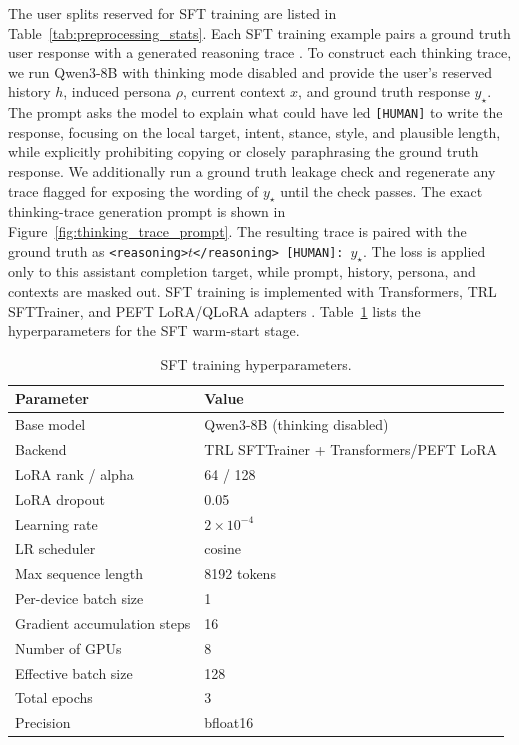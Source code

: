 \documentclass[11pt]{article}
\begin{document}
The user splits reserved for SFT training are listed in Table~\ref{tab:preprocessing_stats}. Each SFT training example pairs a ground truth user response with a generated reasoning trace \citep{lu2026llmagentssimulatemultiturn}. To construct each thinking trace, we run Qwen3-8B with thinking mode disabled and provide the user's reserved history $h$, induced persona $\rho$, current context $x$, and ground truth response $y_{\star}$. The prompt asks the model to explain what could have led \texttt{[HUMAN]} to write the response, focusing on the local target, intent, stance, style, and plausible length, while explicitly prohibiting copying or closely paraphrasing the ground truth response. We additionally run a ground truth leakage check and regenerate any trace flagged for exposing the wording of $y_{\star}$ until the check passes. The exact thinking-trace generation prompt is shown in Figure~\ref{fig:thinking_trace_prompt}. The resulting trace is paired with the ground truth as \texttt{<reasoning>}$t$\texttt{</reasoning> [HUMAN]:}~$y_{\star}$. The loss is applied only to this assistant completion target, while prompt, history, persona, and contexts are masked out. SFT training is implemented with Transformers, TRL SFTTrainer, and PEFT LoRA/QLoRA adapters \citep{transformers, TRL, peft}. Table~\ref{tab:sft_hyperparams} lists the hyperparameters for the SFT warm-start stage.



\clearpage
\begin{table}[t]
\centering
\small
\begin{tabular*}{\textwidth}{@{\extracolsep{\fill}}ll@{}}
\toprule
\textbf{Parameter} & \textbf{Value} \\
\midrule
Base model & Qwen3-8B (thinking disabled)\\
Backend & TRL SFTTrainer + Transformers/PEFT LoRA\\
LoRA rank / alpha & 64 / 128 \\
LoRA dropout & 0.05 \\
Learning rate & $2 \times 10^{-4}$ \\
LR scheduler & cosine \\
Max sequence length & 8192 tokens \\
Per-device batch size & 1 \\
Gradient accumulation steps & 16 \\
Number of GPUs & 8 \\
Effective batch size & 128 \\
Total epochs & 3 \\
Precision & bfloat16 \\
\bottomrule
\end{tabular*}
\caption{SFT training hyperparameters.}
\label{tab:sft_hyperparams}
\end{table}
\end{document}
